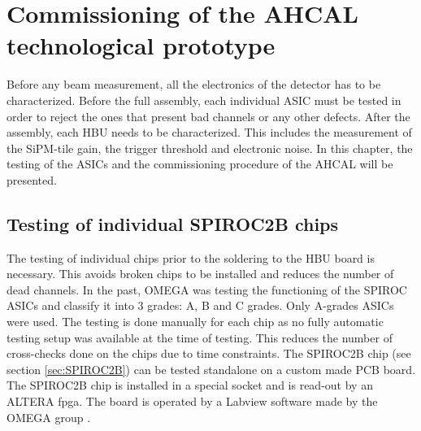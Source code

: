 \chapter{Commissioning of the AHCAL technological prototype}
\label{chap:Commissioning}

Before any beam measurement, all the electronics of the detector has to be characterized. Before the full assembly, each individual ASIC must be tested in order to reject the ones that present bad channels or any other defects. After the assembly, each HBU needs to be characterized. This includes the measurement of the SiPM-tile gain, the trigger threshold and electronic noise. In this chapter, the testing of the ASICs and the commissioning procedure of the AHCAL will be presented.

\section{Testing of individual SPIROC2B chips}

The testing of individual chips prior to the soldering to the HBU board is necessary. This avoids broken chips to be installed and reduces the number of dead channels. In the past, OMEGA was testing the functioning of the SPIROC ASICs and classify it into 3 grades: A, B and C grades. Only A-grades ASICs were used. The testing is done manually for each chip as no fully automatic testing setup was available at the time of testing. This reduces the number of cross-checks done on the chips due to time constraints. The SPIROC2B chip (see section \ref{sec:SPIROC2B}) can be tested standalone on a custom made PCB board. The SPIROC2B chip is installed in a special socket and is read-out by an ALTERA \acrshort{fpga}. The board is operated by a Labview software made by the OMEGA group \cite{OmegaWeb}.

